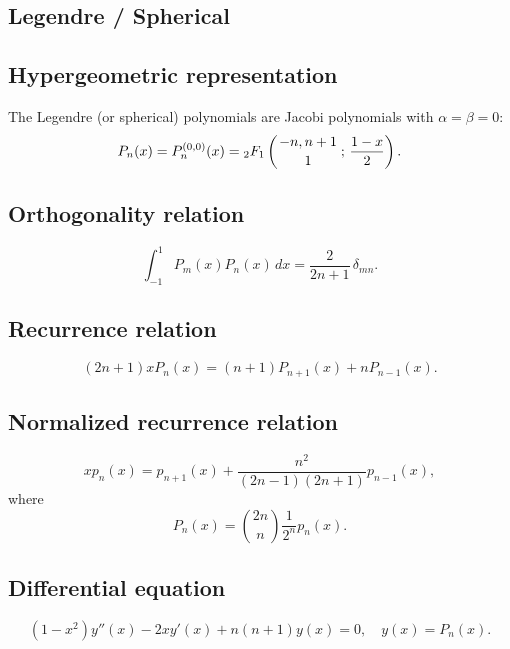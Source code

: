 \documentclass[envcountchap,graybox]{svmono}
\newcommand{\hyp}[5]{\mbox{}_{#1}{F}_{#2}
\left(\genfrac{}{}{0pt}{}{#3}{#4}\,;\,#5\right)}
\newcommand{\hyp}[5]{\,\mbox{}_{#1}F_{#2}\!\left(
  \genfrac{}{}{0pt}{}{#3}{#4};#5\right)}
\begin{document}
\subsection{Legendre / Spherical}

\par

\subsection*{Hypergeometric representation}
The Legendre (or spherical) polynomials are Jacobi polynomials with $\alpha=\beta=0$:
\begin{equation}
\label{DefLegendre}
P_n(x)=P_n^{(0,0)}(x)=\hyp{2}{1}{-n,n+1}{1}{\frac{1-x}{2}}.
\end{equation}

\subsection*{Orthogonality relation}
\begin{equation}
\label{OrtLegendre}
\int_{-1}^1P_m(x)P_n(x)\,dx=\frac{2}{2n+1}\,\delta_{mn}.
\end{equation}

\subsection*{Recurrence relation}
\begin{equation}
\label{RecLegendre}
(2n+1)xP_n(x)=(n+1)P_{n+1}(x)+nP_{n-1}(x).
\end{equation}

\subsection*{Normalized recurrence relation}
\begin{equation}
\label{NormRecLegendre}
xp_n(x)=p_{n+1}(x)+\frac{n^2}{(2n-1)(2n+1)}p_{n-1}(x),
\end{equation}
where
$$P_n(x)=\binom{2n}{n}\frac{1}{2^n}p_n(x).$$

\subsection*{Differential equation}
\begin{equation}
\label{dvLegendre}
(1-x^2)y''(x)-2xy'(x)+n(n+1)y(x)=0,\quad y(x)=P_n(x).
\end{equation}
\end{document}
